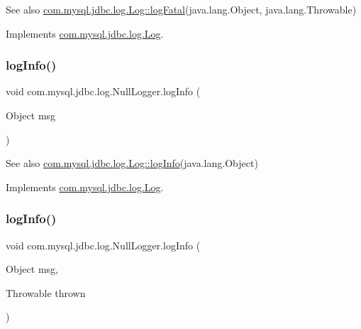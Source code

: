 \begin{DoxySeeAlso}{See also}
\mbox{\hyperlink{interfacecom_1_1mysql_1_1jdbc_1_1log_1_1_log_a8d3b6b295ded6eaa1bfa50ffca6a4d28}{com.\+mysql.\+jdbc.\+log.\+Log\+::log\+Fatal}}(java.\+lang.\+Object, java.\+lang.\+Throwable) 
\end{DoxySeeAlso}


Implements \mbox{\hyperlink{interfacecom_1_1mysql_1_1jdbc_1_1log_1_1_log_a6da5bf2be5d9c63cfd192ab457aaff92}{com.\+mysql.\+jdbc.\+log.\+Log}}.

\mbox{\label{classcom_1_1mysql_1_1jdbc_1_1log_1_1_null_logger_afa227f49b4d9992c7e4393e278dc1a77}} 
\subsubsection{\texorpdfstring{log\+Info()}{logInfo()}\hspace{0.1cm}{\footnotesize\ttfamily [1/2]}}
{\footnotesize\ttfamily void com.\+mysql.\+jdbc.\+log.\+Null\+Logger.\+log\+Info (\begin{DoxyParamCaption}\item[{Object}]{msg }\end{DoxyParamCaption})}

\begin{DoxySeeAlso}{See also}
\mbox{\hyperlink{interfacecom_1_1mysql_1_1jdbc_1_1log_1_1_log_a6a380b7638c3ebe1251d4e07cb7f4569}{com.\+mysql.\+jdbc.\+log.\+Log\+::log\+Info}}(java.\+lang.\+Object) 
\end{DoxySeeAlso}


Implements \mbox{\hyperlink{interfacecom_1_1mysql_1_1jdbc_1_1log_1_1_log_a6a380b7638c3ebe1251d4e07cb7f4569}{com.\+mysql.\+jdbc.\+log.\+Log}}.

\mbox{\label{classcom_1_1mysql_1_1jdbc_1_1log_1_1_null_logger_a1b2aee92fb46eff36af64ff88e877f17}} 
\subsubsection{\texorpdfstring{log\+Info()}{logInfo()}\hspace{0.1cm}{\footnotesize\ttfamily [2/2]}}
{\footnotesize\ttfamily void com.\+mysql.\+jdbc.\+log.\+Null\+Logger.\+log\+Info (\begin{DoxyParamCaption}\item[{Object}]{msg,  }\item[{Throwable}]{thrown }\end{DoxyParamCaption})}

